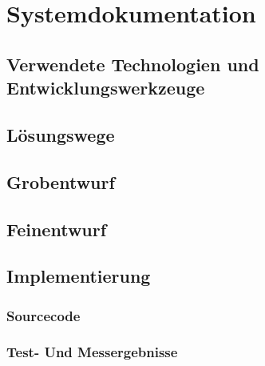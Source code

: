 \chapter{Systemdokumentation}

\section[Technologien]{Verwendete Technologien und Entwicklungswerkzeuge}





\section{Lösungswege}




\section{Grobentwurf}

\section{Feinentwurf}

\section{Implementierung}

\subsection{Sourcecode}

\subsection{Test- Und Messergebnisse}
